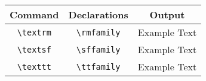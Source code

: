 \documentclass{article}
\newcommand{\head}[1]{\textnormal{\textbf{#1}}}
\begin{document}
\begin{tabular}{|c|c|c|}
\hline
\head{Command}&\head{Declarations}&\head{Output}\\
\hline

\verb|\textrm|&\verb|\rmfamily|&\rmfamily Example Text\\
\verb|\textsf|&\verb|\sffamily|&\sffamily Example Text\\
\verb|\texttt|&\verb|\ttfamily|&\ttfamily Example Text\\
\hline
\end{tabular}
\end{document}
